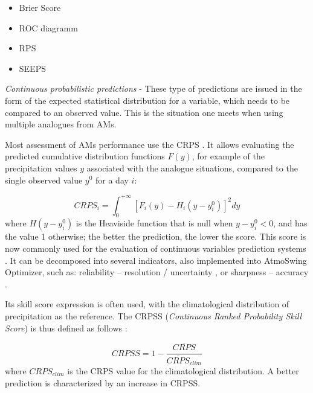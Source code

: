 \documentclass[review]{elsarticle}
\begin{document}
\begin{itemize}
	\item Brier Score \citep{Brier1950}
	\item ROC diagramm \citep[Relative Operating Characteristic or Receiver Operating Characteristic,][]{Mason1982}
	\item RPS \citep[Ranked Probability Score,][]{Epstein1969}
	\item SEEPS \citep[Stable Equitable Error in Probability Space,][]{Rodwell2010,Rodwell2011}
\end{itemize}


\textit{Continuous probabilistic predictions} - These type of predictions are issued in the form of the expected statistical distribution for a variable, which needs to be compared to an observed value. This is the situation one meets when using multiple analogues from AMs.

Most assessment of AMs performance use the CRPS \citep[Continuous Ranked Probability Score,][]{Brown1974, Matheson1976, Hersbach2000}. It allows evaluating the predicted cumulative distribution functions $F(y)$, for example of the precipitation values $y$ associated with the analogue situations, compared to the single observed value $y^{0}$ for a day $i$:

\begin{equation}
\label{eq:CRPS}
CRPS_{i} = \int_{0}^{+\infty} \left[ F_{i}(y)-H_{i}(y-y_{i}^{0})\right]^{2} dy
\end{equation}
where $H(y-y_{i}^{0})$ is the Heaviside function that is null when $y-y_{i}^{0}<0$, and has the value 1 otherwise; the better the prediction, the lower the score. This score is now commonly used for the evaluation of continuous variables prediction systems \citep{Casati2008, Marty2010}. It can be decomposed into several indicators, also implemented into AtmoSwing Optimizer, such as: reliability -- resolution / uncertainty \citep{Hersbach2000}, or sharpness -- accuracy \citep{Bontron2004}.

Its skill score expression is often used, with the climatological distribution of precipitation as the reference. The CRPSS (\textit{Continuous Ranked Probability Skill Score}) is thus defined as follows \citep{Bradley2011}:

\begin{equation}
\label{eq:CRPSS}
CRPSS = 1-\frac{\overline{CRPS}}{\overline{CRPS}_{clim}}
\end{equation}
where $CRPS_{clim}$ is the CRPS value for the climatological distribution. A better prediction is characterized by an increase in CRPSS.
\end{document}
